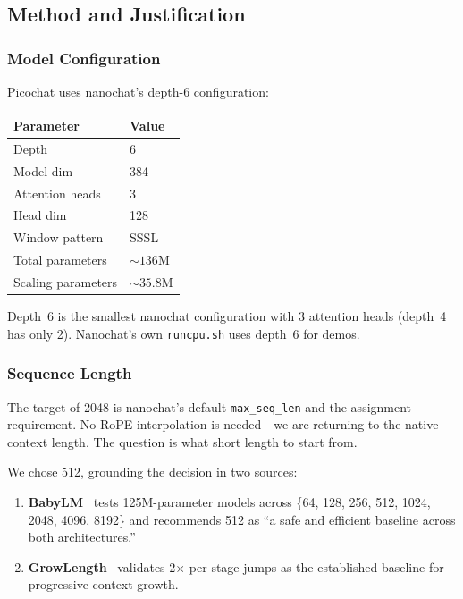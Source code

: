 \subsection{Method and Justification}

\subsubsection{Model Configuration}

Picochat uses nanochat's depth-6 configuration:

\begin{table}[H]
\centering\small
\begin{tabular}{@{}ll@{}}
\toprule
Parameter & Value \\
\midrule
Depth & 6 \\
Model dim & 384 \\
Attention heads & 3 \\
Head dim & 128 \\
Window pattern & SSSL \\
Total parameters & ${\sim}136$M \\
Scaling parameters & ${\sim}35.8$M \\
\bottomrule
\end{tabular}
\end{table}

Depth~6 is the smallest nanochat configuration with 3 attention heads (depth~4 has only 2). Nanochat's own \texttt{runcpu.sh} uses depth~6 for demos.

\subsubsection{Sequence Length}

The target of 2048 is nanochat's default \texttt{max\_seq\_len} and the assignment requirement. No RoPE interpolation is needed---we are returning to the native context length. The question is what short length to start from.

We chose 512, grounding the decision in two sources:

\begin{enumerate}
  \item \textbf{BabyLM}~\cite{babyslen} tests 125M-parameter models across \{64, 128, 256, 512, 1024, 2048, 4096, 8192\} and recommends 512 as ``a safe and efficient baseline across both architectures.''
  \item \textbf{GrowLength}~\cite{growlength} validates 2$\times$ per-stage jumps as the established baseline for progressive context growth.
\end{enumerate}

